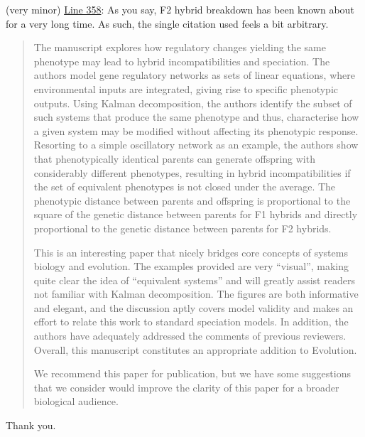\begin{point}{}
  (very minor) \hyperlink{rev1:6}{Line 358}: As you say, F2 hybrid breakdown has been known about for a very long time. As such, the single citation used feels a bit arbitrary.
\end{point}


\begin{quote}
The manuscript explores how regulatory changes yielding the same phenotype may lead to hybrid incompatibilities and speciation. The authors model gene regulatory networks as sets of linear equations, where environmental inputs are integrated, giving rise to specific phenotypic outputs. Using Kalman decomposition, the authors identify the subset of such systems that produce the same phenotype and thus, characterise how a given system may be modified without affecting its phenotypic response. Resorting to a simple oscillatory network as an example, the authors show that phenotypically identical parents can generate offspring with considerably different phenotypes, resulting in hybrid incompatibilities if the set of equivalent phenotypes is not closed under the average. The phenotypic distance between parents and offspring is proportional to the square of the genetic distance between parents for F1 hybrids and directly proportional to the genetic distance between parents for F2 hybrids.

This is an interesting paper that nicely bridges core concepts of systems biology and evolution. The examples provided are very ``visual'', making quite clear the idea of ``equivalent systems'' and will greatly assist readers not familiar with Kalman decomposition. The figures are both informative and elegant, and the discussion aptly covers model validity and makes an effort to relate this work to standard speciation models. In addition, the authors have adequately addressed the comments of previous reviewers. Overall, this manuscript constitutes an appropriate addition to Evolution.

We recommend this paper for publication, but we have some suggestions that we consider would improve the clarity of this paper for a broader biological audience.
\end{quote}

Thank you. 

